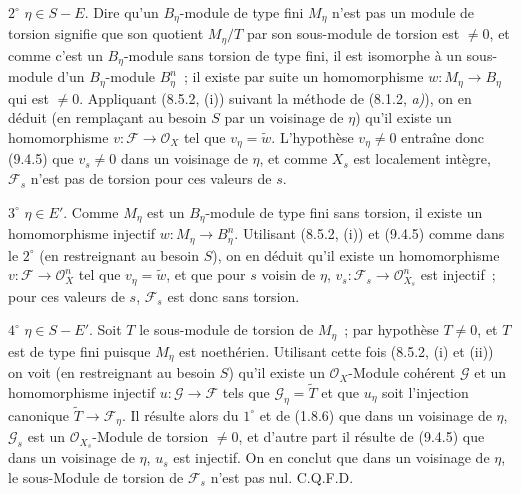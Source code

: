 $2^\circ$ $\eta\in S-E$. Dire qu'un $B_\eta$-module de type fini $M_\eta$
n'est pas un module de torsion signifie que son quotient $M_\eta/T$ par son
sous-module de torsion est $\neq0$, et comme c'est un $B_\eta$-module sans
torsion de type fini, il est isomorphe à un sous-module d'un $B_\eta$-module
$B_\eta^n$~; il existe par suite un homomorphisme
$w:M_\eta\to B_\eta$ qui est $\neq0$. Appliquant (8.5.2, (i)) suivant la
méthode de (8.1.2, \emph{a)}), on en déduit (en remplaçant au besoin $S$ par un
voisinage de $\eta$) qu'il existe un homomorphisme
$v:\mathcal F\to\mathcal O_X$ tel que $v_\eta=\widetilde w$. L'hypothèse
$v_\eta\neq0$ entraîne donc (9.4.5) que $v_s\neq0$ dans un voisinage de
$\eta$, et comme $X_s$ est localement intègre, $\mathcal F_s$ n'est pas de
torsion pour ces valeurs de $s$.

$3^\circ$ $\eta\in E'$. Comme $M_\eta$ est un $B_\eta$-module de type fini
sans torsion, il existe un homomorphisme injectif
$w:M_\eta\to B_\eta^n$. Utilisant (8.5.2, (i)) et (9.4.5) comme dans le
$2^\circ$ (en restreignant au besoin $S$), on en déduit qu'il existe un
homomorphisme $v:\mathcal F\to\mathcal O_X^n$ tel que $v_\eta=\widetilde w$,
et que pour $s$ voisin de $\eta$,
$v_s:\mathcal F_s\to\mathcal O_{X_s}^n$ est injectif~; pour ces valeurs de
$s$, $\mathcal F_s$ est donc sans torsion.

$4^\circ$ $\eta\in S-E'$. Soit $T$ le sous-module de torsion de $M_\eta$~;
par hypothèse $T\neq0$, et $T$ est de type fini puisque $M_\eta$ est
noethérien. Utilisant cette fois (8.5.2, (i) et (ii)) on voit (en restreignant
au besoin $S$) qu'il existe un $\mathcal O_X$-Module cohérent $\mathcal G$ et
un homomorphisme injectif $u:\mathcal G\to\mathcal F$ tels que
$\mathcal G_\eta=\widetilde T$ et que $u_\eta$ soit l'injection canonique
$\widetilde T\to\mathcal F_\eta$. Il résulte alors du $1^\circ$ et de (1.8.6)
que dans un voisinage de $\eta$, $\mathcal G_s$ est un
$\mathcal O_{X_s}$-Module de torsion $\neq0$, et d'autre part il résulte de
(9.4.5) que dans un voisinage de $\eta$, $u_s$ est injectif. On en conclut que
dans un voisinage de $\eta$, le sous-Module de torsion de $\mathcal F_s$ n'est
pas nul. C.Q.F.D.

